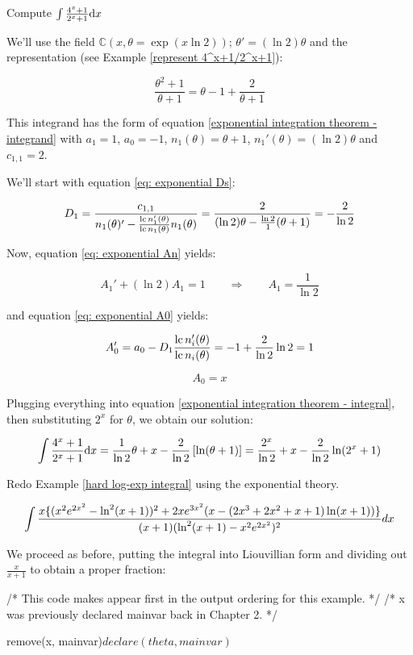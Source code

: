 \vfil\eject

\example Compute $\int {{4^x+1}\over{2^x+1}} {\rm d}x$
\label{integrate 4^x+1/2^x+1}

We'll use the field ${\mathbb C}(x,\theta = \exp(x \ln 2))$; $\theta' =
(\ln 2)\theta$ and the representation (see Example
\ref{represent 4^x+1/2^x+1}):

$$ \frac{\theta^2+1}{\theta+1} = \theta-1+\frac{2}{\theta+1}$$

This integrand has the form of equation
\eqref{exponential integration theorem - integrand}
with $a_1=1$, $a_0=-1$, $n_1(\theta)=\theta+1$,
$n_1'(\theta) = (\ln 2)\theta$ and $c_{1,1}=2$.

We'll start with equation
\eqref{eq: exponential Ds}:

$$ D_1 = \frac{c_{1,1}}{n_1(\theta)' - \frac{{\rm lc\,} n_1'(\theta)}{{\rm lc\,} n_1(\theta)} n_1(\theta)} = \frac{2}{(\ln 2) \theta - \frac{\ln 2}{1} (\theta +1 )} = -\frac{2}{\ln 2}$$

Now, equation \eqref{eq: exponential An} yields:

$$A_1' + (\ln 2) A_1 = 1 \qquad\Longrightarrow\qquad A_1 = \frac{1}{\ln 2}$$

and equation \eqref{eq: exponential A0} yields:

$$A_0' = a_0 - D_1 \frac{{\rm lc\,} n_i'(\theta)}{{\rm lc\,} n_i(\theta)} = -1 + \frac{2}{\ln 2} \ln 2 = 1$$

$$A_0 = x$$

Plugging everything into equation \eqref{exponential integration theorem - integral},
then substituting $2^x$ for $\theta$,
we obtain our solution:

$$\int {{4^x+1}\over{2^x+1}} {\rm d}x = \frac{1}{\ln 2}\theta + x  - \frac{2}{\ln 2}\left[\ln(\theta+1)\right] =
\frac{2^x}{\ln 2} + x - \frac{2}{\ln 2}\ln(2^x+1) $$

\endexample

\vfill\eject

\example
Redo Example \ref{hard log-exp integral} using the exponential theory.

$$\int{{x\{(x^2e^{2x^2}-\ln^2(x+1))^2+2xe^{3x^2}(x-(2x^3+2x^2+x+1)\ln(x+1))\}}\over{(x+1)(\ln^2(x+1) - x^2e^{2x^2})^2}} dx$$

We proceed as before, putting the integral into Liouvillian form
and dividing out $\frac{x}{x+1}$ to obtain a proper fraction:

\begin{maximacode}
/* This code makes \theta appear first in the output ordering for this example. */
/* x was previously declared mainvar back in Chapter 2. */

remove(x, mainvar)$
declare(theta, mainvar)$
\end{maximacode}

